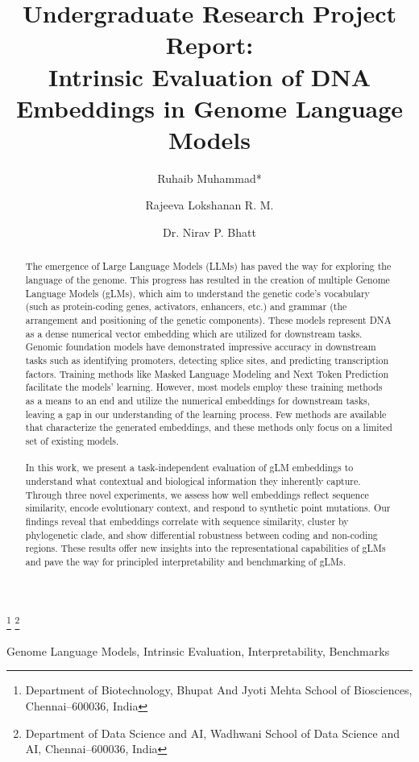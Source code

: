 \documentclass{ifacconf}
\begin{document}
\begin{frontmatter}

\title{Undergraduate Research Project Report: \\Intrinsic Evaluation of DNA Embeddings in Genome Language Models} 

\author[1,2]{Ruhaib Muhammad*}
\author[1,2]{Rajeeva Lokshanan R. M.}
\author[1,2]{Dr. Nirav P. Bhatt}

\thanks[1]{Department of Biotechnology, Bhupat And Jyoti Mehta School of Biosciences, Chennai--600036, India}
\thanks[2]{Department of Data Science and AI, Wadhwani School of Data Science and AI, Chennai--600036, India}


\maketitle

\begin{abstract}                %
The emergence of Large Language Models (LLMs) has paved the way for exploring the language of the genome. This progress has resulted in the creation of multiple Genome Language Models (gLMs), which aim to understand the genetic code's vocabulary (such as protein-coding genes, activators, enhancers, etc.) and grammar (the arrangement and positioning of the genetic components). These models represent DNA as a dense numerical vector embedding which are utilized for downstream tasks. Genomic foundation models have demonstrated impressive accuracy in downstream tasks such as identifying promoters, detecting splice sites, and predicting transcription factors. Training methods like Masked Language Modeling and Next Token Prediction facilitate the models' learning. However, most models employ these training methods as a means to an end and utilize the numerical embeddings for downstream tasks, leaving a gap in our understanding of the learning process. Few methods are available that characterize the generated embeddings, and these methods only focus on a limited set of existing models. 
\\
\\
In this work, we present a task-independent evaluation of gLM embeddings to understand what contextual and biological information they inherently capture. Through three novel experiments, we assess how well embeddings reflect sequence similarity, encode evolutionary context, and respond to synthetic point mutations. Our findings reveal that embeddings correlate with sequence similarity, cluster by phylogenetic clade, and show differential robustness between coding and non-coding regions. These results offer new insights into the representational capabilities of gLMs and pave the way for principled interpretability and benchmarking of gLMs.
\end{abstract}

\begin{keyword}
Genome Language Models, Intrinsic Evaluation, Interpretability, Benchmarks
\end{keyword}


\end{frontmatter}
\end{document}
